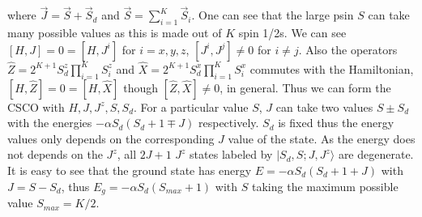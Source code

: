 \documentclass[reprint,prb,superscriptaddress]{revtex4-1}
\begin{document}
where $\vec{J}=\vec{S}+\vec{S}_d$ and $\vec{S}=\sum_{i=1}^{K} \vec{S}_i$. One can see that the large psin $S$ can take many possible values as this is made out of $K$ spin 1/2s. We can see $[H,J]=0=[H,J^i]$ for  $i=x,y,z$, $[J^i,J^j]\neq 0$ for $i\neq j$. Also the operators $\hat{Z}=2^{K+1}S_d^z\prod_{i=1}^{K} S_i^z $ and $\hat{X}=2^{K+1}S_d^x\prod_{i=1}^{K} S_i^x $ commutes with the Hamiltonian, $[H,\hat{Z}]=0=[H,\hat{X}]$ though $[\hat{Z},\hat{X}]\neq 0$, in general.
 Thus we can form the CSCO with $H,J,J^z,S,S_d$. For a particular value $S$, $J$ can take two values $S\pm S_d$ with the energies $-\alpha S_d(S_d+1\mp J)$ respectively. $S_d$ is fixed thus the energy values only depends on the corresponding $J$ value of the state. As the energy does not depends on the $J^z$, all $2J+1$ $J^z$ states labeled by $|S_d,S;J,J^z\rangle$ are degenerate. It is easy to see that the ground state has energy $E=-\alpha S_d(S_d+1+J)$ with  $J=S-S_d$, thus $E_g=-\alpha S_d(S_{max}+1)$ with $S$ taking the maximum possible value $S_{max}=K/2$.
\end{document}
